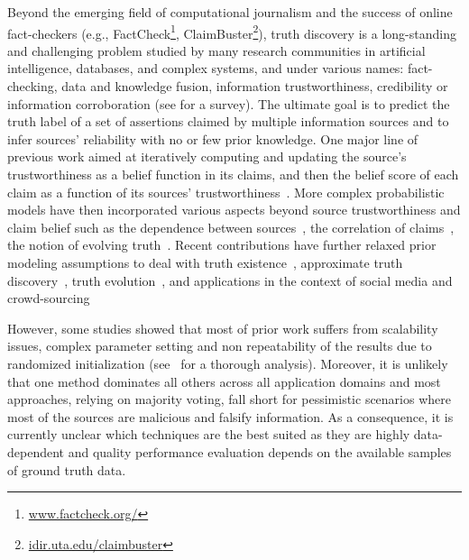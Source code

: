 \documentclass[prodmode,acmtecs]{acmsmall} %
\begin{document}
Beyond the emerging field of computational journalism and the success of online fact-checkers (e.g., FactCheck\footnote{\url{www.factcheck.org/}}, ClaimBuster\footnote{\url{idir.uta.edu/claimbuster}}), 
 truth discovery is a long-standing and challenging problem studied by many research communities in artificial intelligence, databases, and complex systems, and under various 
names: fact-checking, data and knowledge fusion,  information trustworthiness, credibility or information corroboration (see \cite{Berti2015} for a survey).  The ultimate goal  is to predict the truth label of a set of assertions claimed by multiple information sources
 and to infer sources' reliability with no or few prior knowledge. One 
major line of previous work aimed at iteratively computing and updating the source's
trustworthiness as a belief function in its claims, and then the belief score of each 
claim as a function of its sources' trustworthiness~\cite{YinHY08}. More complex probabilistic
models have then incorporated various aspects beyond source trustworthiness and claim belief such
as the dependence between sources~\cite{Dong:2010,DongBHS10a}, the correlation of claims~\cite{Pochampally2014},
the notion of evolving truth~\cite{DongBS09a}.  Recent contributions have further relaxed prior modeling assumptions
to deal with truth existence~\cite{ZhiZTGYJH15}, approximate truth discovery~\cite{Wang2015a,LiLGSZDFH14},  truth evolution~\cite{LiLGSZFH15,JiaWLG13},
and applications in the context of social media and crowd-sourcing~\cite{GaoLZFH15,MaLLQGZSZJH15}

 However, some studies showed that most of prior work suffers from scalability issues, complex parameter setting and non repeatability 
 of the results due to randomized initialization (see~\cite{BW2014} for a thorough analysis). Moreover, it is unlikely that one method dominates
 all others across all application domains and most approaches, relying on majority voting, fall short for pessimistic scenarios where most of the 
 sources are malicious and falsify information. As a consequence, it is currently unclear which techniques are the best suited as they are highly 
 data-dependent and quality performance evaluation depends on the available samples of ground truth data. 
\end{document}
